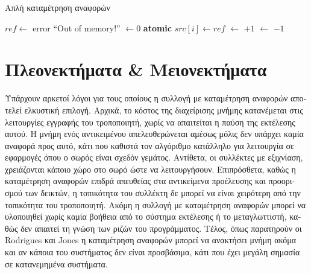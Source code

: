 \begin{greek}
\begin{algorithm}
  \caption{Απλή καταμέτρηση αναφορών}
  \label{alg:refcnt_1}
  \begin{algorithmic}[1]
      \State $ref \gets$ 
        \State error ``Out of memory!''
      \EndIf
      \State {} $\gets 0$
      \State {}
    \EndFunction
    \Statex
      \State \textbf{atomic}
      \State {}
      \State {}
      \State $src[i] \gets ref$
    \EndProcedure
    \Statex
        \State {} $\gets$  $+1$
      \EndIf
    \EndProcedure
    \Statex
        \State {} $\gets$  $-1$
            \State {}
          \EndFor
          \State {}
        \EndIf
      \EndIf
    \EndProcedure
  \end{algorithmic}
\end{algorithm}

\section{Πλεονεκτήματα \& Μειονεκτήματα}
Υπάρχουν αρκετοί λόγοι για τους οποίους η συλλογή με καταμέτρηση
αναφορών αποτελεί ελκυστική επιλογή. Αρχικά, το κόστος της
διαχείρισης μνήμης κατανέμεται στις λειτουργίες εγγραφής του
τροποποιητή, χωρίς να απαιτείται η παύση της εκτέλεσης αυτού.
Η μνήμη ενός αντικειμένου απελευθερώνεται αμέσως μόλις δεν
υπάρχει καμία αναφορά προς αυτό, κάτι που καθιστά τον αλγόριθμο
κατάλληλο για λειτουργία σε εφαρμογές όπου ο σωρός είναι
σχεδόν γεμάτος. Αντίθετα, οι συλλέκτες με εξιχνίαση, χρειάζονται
κάποιο χώρο στο σωρό ώστε να λειτουργήσουν. Επιπρόσθετα,
καθώς η καταμέτρηση αναφορών επιδρά απευθείας στα αντικείμενα
προέλευσης και προορισμού των δεικτών, η τοπικότητα του συλλέκτη
δε μπορεί να είναι χειρότερη από την τοπικότητα του τροποποιητή.
Ακόμη η συλλογή με καταμέτρηση αναφορών μπορεί να υλοποιηθεί
χωρίς καμία βοήθεια από το σύστημα εκτέλεσης ή το μεταγλωττιστή,
καθώς δεν απαιτεί τη γνώση των ριζών του προγράμματος. Τέλος,
όπως παρατηρούν οι Rodrigues και Jones \cite{DBLP:conf/wdag/RodriguesJ96}
η καταμέτρηση αναφορών μπορεί να ανακτήσει μνήμη ακόμα και
αν κάποια του συστήματος δεν είναι προσβάσιμα, κάτι που έχει
μεγάλη σημασία σε κατανεμημένα συστήματα.


\end{greek}
